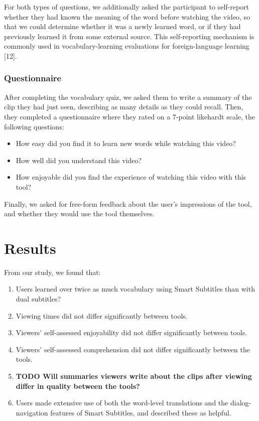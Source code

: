 \documentclass{sigchi}
\begin{document}
For both types of questions, we additionally asked the participant to self-report whether they had known the meaning of the word before watching the video, so that we could determine whether it was a newly learned word, or if they had previously learned it from some external source. This self-reporting mechanism is commonly used in vocabulary-learning evaluations for foreign-language learning [12].

\subsubsection{Questionnaire}

After completing the vocabulary quiz, we asked them to write a summary of the clip they had
just seen, describing as many details as they could recall. Then, they completed
a questionnaire where they rated on a 7-point likehardt scale, the following questions:

\begin{itemize}[noitemsep]
\item How easy did you find it to learn new words while watching this video?
\item How well did you understand this video?
\item How enjoyable did you find the experience of watching this video with this tool?
\end{itemize}

Finally, we asked for free-form feedback about the user's impressions of the tool, and whether they would use the tool themselves.

\section{Results}

From our study, we found that:

\begin{enumerate}[noitemsep]
\item Users learned over twice as much vocabulary using Smart Subtitles than with dual subtitles?
\item Viewing times did not differ significantly between tools.
\item Viewers' self-assessed enjoyability did not differ significantly between tools.
\item Viewers' self-assessed comprehension did not differ significantly between the tools.
\item \textbf{TODO Will summaries viewers write about the clips after viewing differ in quality between the tools?}
\item Users made extensive use of both the word-level translations and the dialog-navigation features of Smart Subtitles, and described these as helpful.
\end{enumerate}
\end{document}
